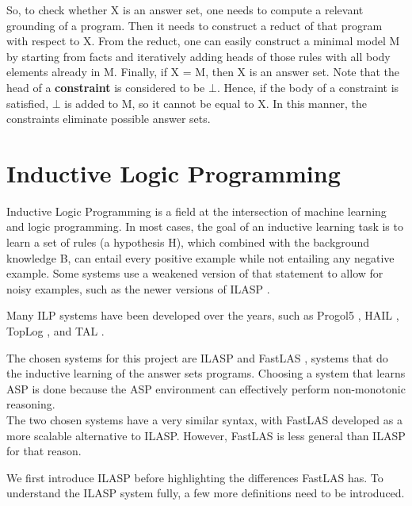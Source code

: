So, to check whether X is an answer set, one needs to compute a relevant grounding of a program. Then it needs to construct a reduct of that program with respect to X.
From the reduct, one can easily construct a minimal model M by starting from facts and iteratively adding heads of those rules with all body elements already in M.
Finally, if X = M, then X is an answer set.
Note that the head of a \textbf{constraint} is considered to be $\bot$. 
Hence, if the body of a constraint is satisfied, $\bot$ is added to M, so it cannot be equal to X.
In this manner, the constraints eliminate possible answer sets.



\section{Inductive Logic Programming}
\label{ilasp-background}

Inductive Logic Programming \cite{RefWorks:RefID:42-muggleton1991inductive} is a field at the intersection of machine learning and logic programming.
In most cases, the goal of an inductive learning task is to learn a set of rules (a hypothesis H), which combined with the background knowledge B, can entail every positive example while not entailing any negative example. 
Some systems use a weakened version of that statement to allow for noisy examples, such as the newer versions of ILASP \cite{RefWorks:RefID:55-law2018inductive}.

Many ILP systems have been developed over the years, such as Progol5 \cite{RefWorks:RefID:43-muggleton2000theory}, HAIL \cite{RefWorks:RefID:44-ray2003hybrid}, TopLog \cite{RefWorks:RefID:45-muggletontoplog:}, and TAL \cite{RefWorks:RefID:46-corapi2010inductive}.

The chosen systems for this project are ILASP \cite{RefWorks:RefID:18-law2020ilasp} and FastLAS \cite{RefWorks:RefID:19-law2020fastlas:}, systems that do the inductive learning of the answer sets programs.
Choosing a system that learns ASP is done because the ASP environment can effectively perform non-monotonic reasoning.\\

The two chosen systems have a very similar syntax, with FastLAS developed as a more scalable alternative to ILASP. 
However, FastLAS is less general than ILASP for that reason.

We first introduce ILASP before highlighting the differences FastLAS has.
To understand the ILASP system fully, a few more definitions need to be introduced.

